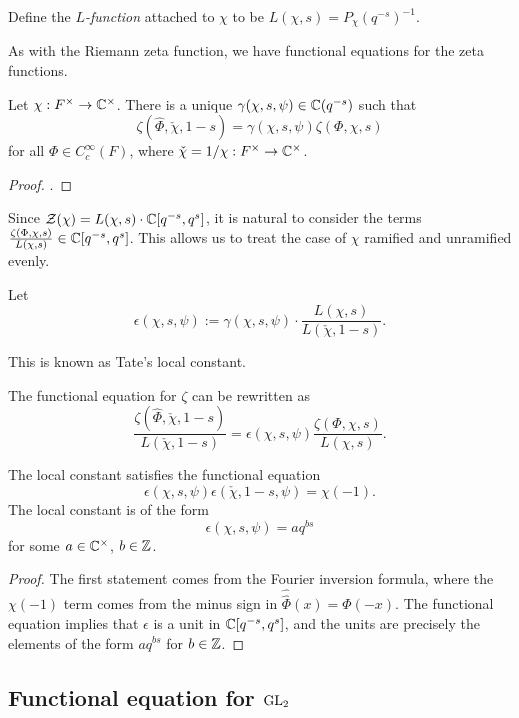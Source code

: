 \begin{defn}
    Define the \textit{$L$-function} attached to $\chi$ to be $L(\chi,s)=P_\chi(q^{-s})^{-1}$.
\end{defn}

As with the Riemann zeta function, we have functional equations for the zeta functions.

\begin{thm}\label{thm:gl1gamma}
    Let $\chi: F^\times \to \mathbb{C}^\times$. There is a unique $\gamma(\chi,s,\psi) \in \mathbb{C}(q^{-s})$ such that 
    $$\zeta(\hat{\Phi}, \check{\chi},1-s) = \gamma(\chi,s,\psi) \zeta(\Phi,\chi,s)$$ for all $\Phi \in C_c^\infty(F)$, where $\check{\chi}=1/\chi : F^\times \to \mathbb{C}^\times$.
\end{thm}
\begin{proof}
    \cite[Theorem 23.3]{BH1}.
\end{proof}

Since $\mathcal Z(\chi) = L(\chi,s)\cdot \mathbb{C}[q^{-s},q^s]$, it is natural to consider the terms $\frac{\zeta(\Phi,\chi,s)}{L(\chi,s)} \in \mathbb{C}[q^{-s},q^s]$. This allows us to treat the case of $\chi$ ramified and unramified evenly. 

\begin{defn}
    Let $$\epsilon(\chi,s,\psi) := \gamma(\chi,s,\psi) \cdot \frac{L(\chi,s)}{L(\check{\chi},1-s)}.$$
\end{defn}
This is known as Tate's local constant.

The functional equation for $\zeta$ can be rewritten as
$$\frac{\zeta(\hat{\Phi},\check{\chi},1-s)}{L(\check{\chi},1-s)} = \epsilon(\chi,s,\psi) \frac{\zeta(\Phi,\chi,s)}{L(\chi,s)}.$$

\begin{cor}
    The local constant satisfies the functional equation
    $$\epsilon(\chi,s,\psi)\epsilon(\check{\chi},1-s,\psi) = \chi(-1).$$
    The local constant is of the form $$\epsilon(\chi,s,\psi) = aq^{bs}$$ for some $a \in \mathbb{C}^\times$, $b \in \mathbb{Z}$.
\end{cor}
\begin{proof}
    The first statement comes from the Fourier inversion formula, where the $\chi(-1)$ term comes from the minus sign in $\hat{\hat{\Phi}}(x) = \Phi(-x)$. The functional equation implies that $\epsilon$ is a unit in $\mathbb{C}[q^{-s},q^s]$, and the units are precisely the elements of the form $aq^{bs}$ for $b \in \mathbb{Z}$.
\end{proof}


\subsection{Functional equation for \texorpdfstring{$\mathrm{GL}_2$}{TEXT}}

